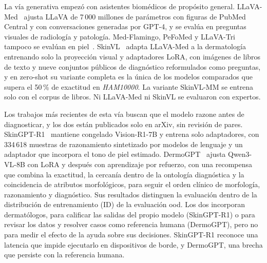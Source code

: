 La vía generativa empezó con asistentes biomédicos de propósito general. LLaVA-Med~\cite{li2023llavamed} ajusta
LLaVA de 7\,000 millones de parámetros con figuras de PubMed Central y con conversaciones generadas por GPT-4, y se
evalúa en preguntas visuales de radiología y patología. Med-Flamingo, PeFoMed y LLaVA-Tri tampoco se evalúan en
piel~\cite{moor2023medflamingo,he2025pefomed,xie2025medtrinity25m}. SkinVL~\cite{zeng2025mmskin} adapta LLaVA-Med a
la dermatología entrenando solo la proyección visual y adaptadores LoRA, con imágenes de libros de texto y nueve
conjuntos públicos de diagnóstico reformulados como preguntas, y en zero-shot su variante completa es la única de los modelos
comparados que supera el 50\,\% de exactitud en \emph{HAM10000}. La variante SkinVL-MM se entrena solo con el corpus de libros. Ni LLaVA-Med ni SkinVL se evaluaron con expertos.

Los trabajos más recientes de esta vía buscan que el modelo razone antes de diagnosticar, y los dos están
publicados solo en arXiv, sin revisión de pares. SkinGPT-R1~\cite{shen2025skingptr1} mantiene congelado
Vision-R1-7B y entrena solo adaptadores, con 334\,618 muestras de razonamiento sintetizado por modelos de lenguaje y
un adaptador que incorpora el tono de piel estimado. DermoGPT~\cite{ru2026dermogpt} ajusta Qwen3-VL-8B con LoRA y
después con aprendizaje por refuerzo, con una recompensa que combina la exactitud, la cercanía dentro de la
ontología diagnóstica y la coincidencia de atributos morfológicos, para seguir el orden clínico de morfología,
razonamiento y diagnóstico. Sus resultados distinguen la evaluación dentro de la distribución de entrenamiento
(ID) de la evaluación \gls{ood}. Los dos incorporan dermatólogos, para calificar las salidas del propio modelo
(SkinGPT-R1) o para revisar los datos y resolver casos como referencia humana (DermoGPT), pero no para medir el
efecto de la ayuda sobre sus decisiones. SkinGPT-R1 reconoce una latencia que impide ejecutarlo en dispositivos de
borde, y DermoGPT, una brecha que persiste con la referencia humana.

